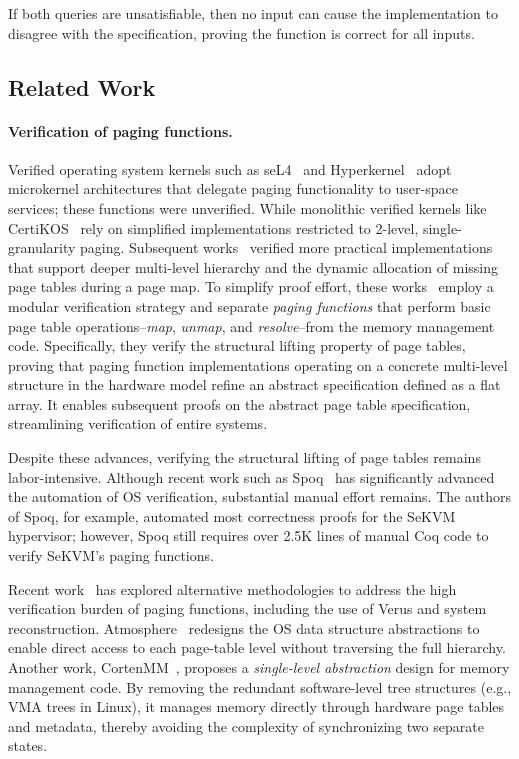 If both queries are unsatisfiable, then no input can cause the implementation
to disagree with the specification, proving the function is correct for all
inputs.

\subsection{Related Work} 
\paragraph{Verification of paging functions.} Verified operating system kernels such as seL4~\cite{sel4} and Hyperkernel~\cite{hyperkernel} adopt microkernel architectures that delegate paging functionality to user-space services; these functions were unverified. While monolithic verified kernels like CertiKOS~\cite{certikos} rely on simplified implementations restricted to 2-level, single-granularity paging. Subsequent works~\cite{li:ieeesp2021,brun23hotos} verified more practical implementations that support deeper multi-level hierarchy and the dynamic allocation of missing page tables during a page map. To simplify proof effort, these works~\cite{li:ieeesp2021,brun23hotos} employ a modular verification strategy and separate \emph{paging functions} that perform basic page table operations--\textit{map}, \textit{unmap}, and \textit{resolve}--from the memory management code. Specifically, they verify the structural lifting property of page tables, proving that paging function implementations operating on a concrete multi-level structure in the hardware model refine an abstract specification defined as a flat array. It enables subsequent proofs on the abstract page table specification, streamlining verification of entire systems. 

Despite these advances, verifying the structural lifting of page tables remains labor-intensive. Although recent work such as Spoq~\cite{spoq} has significantly advanced the automation of OS verification, substantial manual effort remains. The authors of Spoq, for example, automated most correctness proofs for the SeKVM~\cite{li:ieeesp2021} hypervisor; however, Spoq still requires over 2.5K lines of manual Coq code to verify SeKVM's paging functions. 


Recent work~\cite{atmosphere2025sosp,zhang25cortenmm} has explored alternative methodologies to address the high verification burden of paging functions, including the use of Verus and system reconstruction.  Atmosphere~\cite{atmosphere2025sosp} redesigns the OS data structure abstractions to enable direct access to each page-table level without traversing the full hierarchy. Another work, CortenMM~\cite{zhang25cortenmm}, proposes a \emph{single-level abstraction} design for memory management code. By removing the redundant software-level tree structures (e.g., VMA trees in Linux), it manages memory directly through hardware page tables and metadata, thereby avoiding the complexity of synchronizing two separate states.

